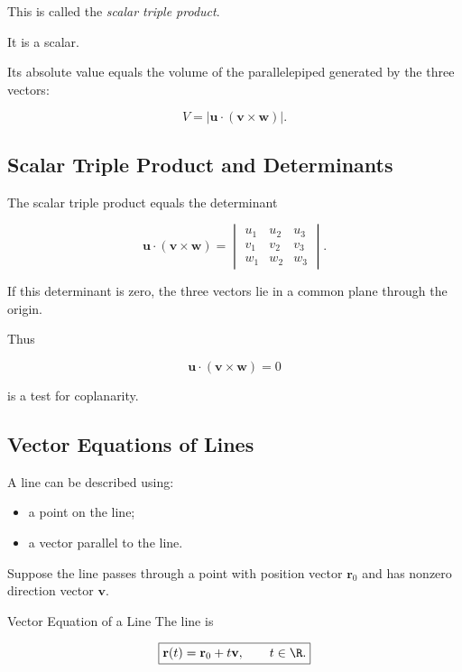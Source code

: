 This is called the \emph{scalar triple product}.

It is a scalar.

Its absolute value equals the volume of the parallelepiped generated by the
three vectors:

\[
\boxed{
V=
\left|
\mathbf{u}\cdot(\mathbf{v}\times\mathbf{w})
\right|.
}
\]

\subsection{Scalar Triple Product and Determinants}
\label{subsec:triple-product-determinant}

The scalar triple product equals the determinant

\[
\boxed{
\mathbf{u}\cdot(\mathbf{v}\times\mathbf{w})
=
\begin{vmatrix}
u_1&u_2&u_3\\
v_1&v_2&v_3\\
w_1&w_2&w_3
\end{vmatrix}.
}
\]

If this determinant is zero, the three vectors lie in a common plane through
the origin.

Thus

\[
\boxed{
\mathbf{u}\cdot(\mathbf{v}\times\mathbf{w})=0
}
\]

is a test for coplanarity.

\subsection{Vector Equations of Lines}
\label{subsec:vector-equations-lines}

A line can be described using:

\begin{itemize}
    \item a point on the line;
    \item a vector parallel to the line.
\end{itemize}

Suppose the line passes through a point with position vector
\(\mathbf{r}_0\) and has nonzero direction vector \(\mathbf{v}\).

\begin{definitionbox}{Vector Equation of a Line}
The line is

\[ \boxed{\mathbf{r}(t)=\mathbf{r}_0+t\mathbf{v},\qquad t\in\R.} \]
\end{definitionbox}

